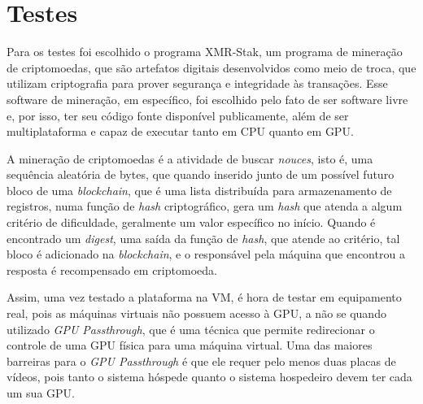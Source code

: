 
\section{Testes}

Para os testes foi escolhido o programa XMR-Stak\cite{xmr_stak}, um programa de mineração de criptomoedas, que são artefatos digitais desenvolvidos como meio de troca, que utilizam criptografia para prover segurança e integridade às transações\cite{crypto_currencies}. Esse software de mineração, em específico, foi escolhido pelo fato de ser software livre e, por isso, ter seu código fonte disponível publicamente, além de ser multiplataforma e capaz de executar tanto em \acrshort{CPU} quanto em \acrshort{GPU}.

A mineração de criptomoedas é a atividade de buscar \textit{nouces}, isto é, uma sequência aleatória de bytes, que quando inserido junto de um possível futuro bloco de uma \textit{blockchain}, que é uma lista distribuída para armazenamento de registros, numa função de \textit{hash} criptográfico, gera um \textit{hash} que atenda a algum critério de dificuldade, geralmente um valor específico no início. Quando é encontrado um \textit{digest}, uma saída da função de \textit{hash}, que atende ao critério, tal bloco é adicionado na \textit{blockchain}, e o responsável pela máquina que encontrou a resposta é recompensado em criptomoeda.

Assim, uma vez testado a plataforma na \acrshort{VM}, é hora de testar em equipamento real, pois as máquinas virtuais não possuem acesso à \acrshort{GPU}, a não se quando utilizado \textit{\acrshort{GPU} Passthrough}, que é uma técnica que permite redirecionar o controle de uma \acrshort{GPU} física para uma máquina virtual. Uma das maiores barreiras para o \textit{\acrshort{GPU} Passthrough} é que ele requer pelo menos duas placas de vídeos, pois tanto o sistema hóspede quanto o sistema hospedeiro devem ter cada um sua \acrshort{GPU}.


